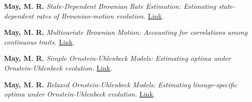 \begin{etaremune}[topsep=0pt,itemsep=1.2em,partopsep=0pt,parsep=0pt]
    \item \textbf{May, M. R.} \textit{State-Dependent Brownian Rate Estimation: Estimating state-dependent rates of Brownian-motion evolution.} \href{https://revbayes.github.io/tutorials/cont_traits/state_dependent_bm.html}{Link}.
    \item \textbf{May, M. R.} \textit{Multivariate Brownian Motion: Accounting for correlations among continuous traits.} \href{https://revbayes.github.io/tutorials/cont_traits/multivariate_bm.html}{Link}.
    \item \textbf{May, M. R.} \textit{Simple Ornstein-Uhlenbeck Models: Estimating optima under Ornstein-Uhlenbeck evolution.} \href{https://revbayes.github.io/tutorials/cont_traits/simple_ou.html}{Link}.
    \item \textbf{May, M. R.} \textit{Relaxed Ornstein-Uhlenbeck Models: Estimating lineage-specific optima under Ornstein-Uhlenbeck evolution.} \href{https://revbayes.github.io/tutorials/cont_traits/relaxed_ou.html}{Link}.
\end{etaremune}